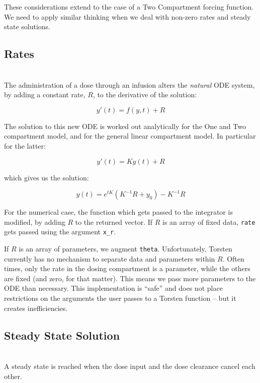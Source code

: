 \documentclass[11pt]{amsart}
\begin{document}
These considerations extend to the case of a Two Compartment forcing function. We need to apply 
similar thinking when we deal with non-zero rates and steady state solutions.


\subsection{Rates} \ \\

The administration of a dose through an infusion alters the \textit{natural} ODE system, by 
adding a constant rate, $R$, to the derivative of the solution:

$$
y'(t) = f(y, t) + R
$$

The solution to this new ODE is worked out analytically for the One and Two compartment 
model, and for the general linear compartment model. In particular for the latter:

$$
y'(t) = K y(t) + R
$$

which gives us the solution:

$$
y(t) = e^{tK} (K^{-1}R + y_0) - K^{-1} R
$$ 

For the numerical case, the function which gets passed to the integrator is modified, by adding
 $R$ to the returned vector. If $R$ is an array of fixed data, \texttt{rate} gets passed using the argument
 \texttt{x\_r}.

If $R$ is an array of parameters, we augment \texttt{theta}. Unfortunately, Torsten currently has 
no mechanism to separate data and parameters within $R$. Often times, only the rate in the dosing
compartment is a parameter, while the others are fixed (and zero, for that matter). This means we 
pass more parameters to the ODE  than necessary. This implementation is ``safe'' and does not place
restrictions on the arguments the user passes to a Torsten function -- but it creates inefficiencies.

\subsection{Steady State Solution} \ \\

A steady state is reached when the dose input and the dose clearance cancel each other.
\end{document}

